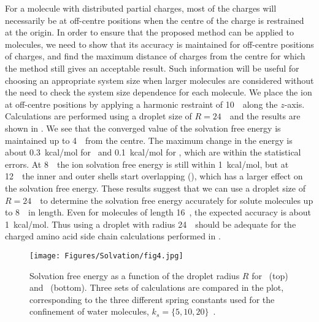 For a molecule with distributed partial charges, most of the charges will necessarily be at off-centre 
positions when the centre of the charge is restrained at the origin. In order to ensure that the 
proposed method can be applied to molecules, we need to show that its accuracy is maintained for 
off-centre positions of charges, and find the maximum distance of charges from the centre for which 
the method still gives an acceptable result. Such information will be useful for choosing an appropriate 
system size when larger molecules are considered without the need to check the system size dependence 
for each molecule. We place the ion at off-centre positions by applying a harmonic restraint of 
10~\spring\ along the $z$-axis. Calculations are performed using a droplet size of 
$R=24$~\angs\ and the results are shown in . We see that the converged value of the 
solvation free energy is maintained up to 4~\angs\ from the centre. The maximum change in the energy is 
about 0.3~kcal/mol for \Na\ and 0.1~kcal/mol for \Cl, which are within the statistical errors. At 
8~\angs\ the ion solvation free energy is still within 1~kcal/mol, but at 12~\angs\ the inner and outer 
shells start overlapping (), which has a larger effect on the solvation free energy. 
These results suggest that we can use a droplet size of $R=24$~\angs\ to determine the solvation free 
energy accurately for solute molecules up to 8~\angs\ in length. Even for molecules of length 16~\angs, 
the expected accuracy is about 1~kcal/mol. Thus using a droplet with radius 24~\angs\ should be adequate 
for the charged amino acid side chain calculations performed in .

\begin{figure}[t!]
\centering
\texttt{[image: Figures/Solvation/fig4.jpg]}
\caption{Solvation free energy as a function of the droplet radius $R$ for 
         \Na\ (top) and \Cl\ (bottom). Three sets of calculations are 
         compared in the plot, corresponding to the three different spring 
         constants used for the confinement of water molecules, 
         $k_{s}=\{5, 10, 20\}$~\spring.}
\label{solv:fig4}
\end{figure}

